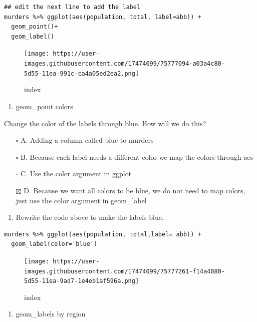 \documentclass[
]{article}
\providecommand{\tightlist}{%
  \setlength{\itemsep}{0pt}\setlength{\parskip}{0pt}}
\begin{document}
\begin{verbatim}
## edit the next line to add the label
murders %>% ggplot(aes(population, total, label=abb)) +
  geom_point()+
  geom_label()
\end{verbatim}

\begin{figure}
\centering
\texttt{[image: https://user-images.githubusercontent.com/17474099/75777094-a03a4c80-5d55-11ea-991c-ca4a05ed2ea2.png]}
\caption{index}
\end{figure}

\begin{enumerate}
\def\labelenumi{\arabic{enumi}.}
\setcounter{enumi}{8}
\tightlist
\item
  geom\_point colors
\end{enumerate}

Change the color of the labels through blue. How will we do this?

\begin{itemize}
\tightlist
\item[$\square$]
  A. Adding a column called blue to murders
\item[$\square$]
  B. Because each label needs a different color we map the colors
  through aes
\item[$\square$]
  C. Use the color argument in ggplot
\item[$\boxtimes$]
  D. Because we want all colors to be blue, we do not need to map
  colors, just use the color argument in geom\_label
\end{itemize}

\begin{enumerate}
\def\labelenumi{\arabic{enumi}.}
\setcounter{enumi}{9}
\tightlist
\item
  Rewrite the code above to make the labels blue.
\end{enumerate}

\begin{verbatim}
murders %>% ggplot(aes(population, total,label= abb)) +
  geom_label(color='blue')
\end{verbatim}

\begin{figure}
\centering
\texttt{[image: https://user-images.githubusercontent.com/17474099/75777261-f14a4080-5d55-11ea-9ad7-1e4eb1af596a.png]}
\caption{index}
\end{figure}

\begin{enumerate}
\def\labelenumi{\arabic{enumi}.}
\setcounter{enumi}{10}
\tightlist
\item
  geom\_labels by region
\end{enumerate}
\end{document}
